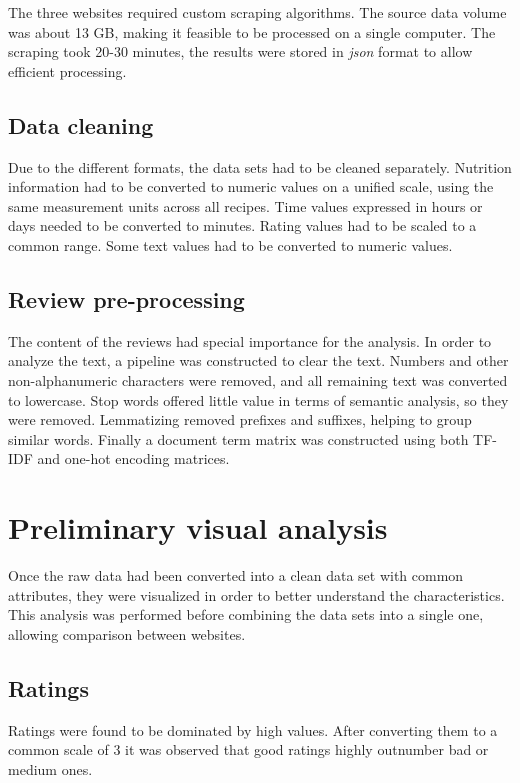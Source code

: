 \documentclass[11pt]{article}
\begin{document}
The three websites required custom scraping algorithms. The source data volume was about 13 GB, making it feasible to be processed on a single computer. The scraping took 20-30 minutes, the results were stored in \textit{json} format to allow efficient processing.

\subsection{Data cleaning}

Due to the different formats, the data sets had to be cleaned separately. Nutrition information had to be converted to numeric values on a unified scale, using the same measurement units across all recipes. Time values expressed in hours or days needed to be converted to minutes. Rating values had to be scaled to a common range. Some text values had to be converted to numeric values.

\subsection{Review pre-processing}

The content of the reviews had special importance for the analysis. In order to analyze the text, a pipeline was constructed to clear the text. Numbers and other non-alphanumeric characters were removed, and all remaining text was converted to lowercase. Stop words offered little value in terms of semantic analysis, so they were removed. Lemmatizing removed prefixes and suffixes, helping to group similar words. Finally a document term matrix was constructed using both TF-IDF and one-hot encoding matrices.

\section{Preliminary visual analysis}

Once the raw data had been converted into a clean data set with common attributes, they were visualized in order to better understand the characteristics. This analysis was performed before combining the data sets into a single one, allowing comparison between websites.

\subsection{Ratings}

Ratings were found to be dominated by high values. After converting them to a common scale of 3 it was observed that good ratings highly outnumber bad or medium ones.
\end{document}
